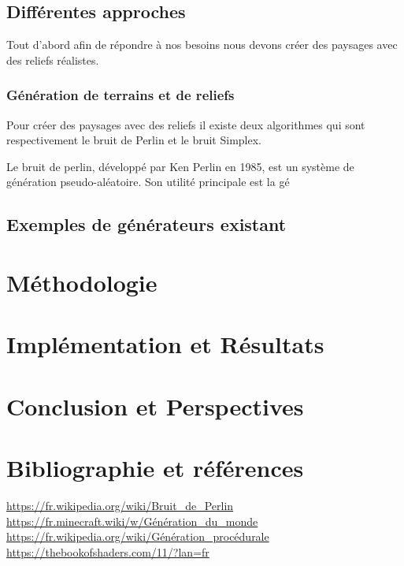 \documentclass{article}
\begin{document}
\subsection{Différentes approches}

Tout d'abord afin de répondre à nos besoins nous devons créer des paysages avec des reliefs réalistes.

\subsubsection{Génération de terrains et de reliefs}

Pour créer des paysages avec des reliefs il existe deux algorithmes qui sont respectivement le bruit de Perlin et le bruit Simplex.

Le bruit de perlin, développé par Ken Perlin en 1985, est un système de génération pseudo-aléatoire. Son utilité principale est la gé

\subsection{Exemples de générateurs existant}






\section{Méthodologie}

\section{Implémentation et Résultats}

\section{Conclusion et Perspectives}

\section{Bibliographie et références}
\url{https://fr.wikipedia.org/wiki/Bruit_de_Perlin}\\
\url{https://fr.minecraft.wiki/w/Génération_du_monde}\\
\url{https://fr.wikipedia.org/wiki/Génération_procédurale}\\
\url{https://thebookofshaders.com/11/?lan=fr}
\end{document}
